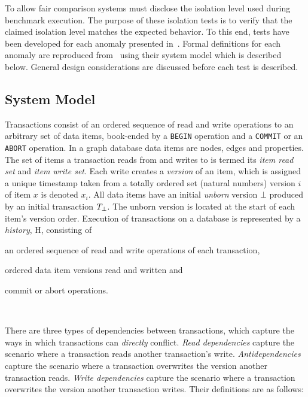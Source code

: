 To allow fair comparison systems must disclose the isolation level used
during benchmark execution. The purpose of these isolation tests is to verify
that the claimed isolation level matches the expected behavior. To this end,
tests have been developed for each anomaly presented
in~\cite{DBLP:journals/tods/BailisFGHS16}. Formal definitions for each anomaly
are reproduced from~\cite{adya1999weak,DBLP:journals/tods/BailisFGHS16} using
their system model which is described below. General design considerations are
discussed before each test is described.

\subsection{System Model}
\label{sec:system-model}

Transactions consist of an ordered sequence of read and write operations to an
arbitrary set of data items, book-ended by a \texttt{BEGIN} operation and a
\texttt{COMMIT} or an \texttt{ABORT} operation. In a graph database data items
are nodes, edges and properties. The set of items a transaction reads from and
writes to is termed its \emph{item read set} and \emph{item write set}. Each
write creates a \emph{version} of an item, which is assigned a unique timestamp
taken from a totally ordered set (\eg natural numbers) version $i$ of item $x$
is denoted $x_i$. All data items have an initial \emph{unborn} version $\bot$
produced by an initial transaction $T_{\bot}$. The unborn version is
located at the start of each item's version order. Execution of transactions
on a database is represented by a \emph{history}, H, consisting of
\begin{enumerate*}[label={(\roman*)}]
  \item an ordered sequence of read and write operations of each transaction,
  \item ordered data item versions read and written and
  \item commit or abort operations.
\end{enumerate*}~\cite{DBLP:journals/tods/BailisFGHS16}

There are three types of dependencies between transactions, which capture the
ways in which transactions can \emph{directly} conflict. \emph{Read dependencies}
capture the scenario where a transaction reads another transaction's write.
\emph{Antidependencies} capture the scenario where a transaction overwrites the
version another transaction reads. \emph{Write dependencies} capture the
scenario where a transaction overwrites the version another transaction writes.
Their definitions are as follows:

